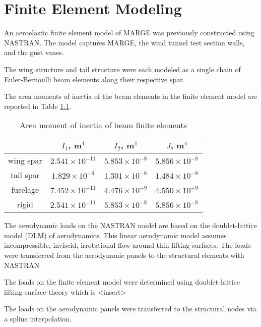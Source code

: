 \chapter{Finite Element Modeling}
\label{ch:nastran}

An aeroelastic finite element model of MARGE was previously constructed using NASTRAN. The model captures MARGE, the wind tunnel test section walls, and the gust vanes.


The wing structure and tail structure were each modeled as a single chain of Euler-Bernoulli beam elements along their respective spar.

The area moments of inertia of the beam elements in the finite element model are reported in Table \ref{tab:beamInertia}.
\begin{table}[H]
    \centering
    \caption{Area moment of inertia of beam finite elements}
    \begin{tabular}{cccc}
        \hline\hline
                  & $I_1$, m$^4$          & $I_2$, m$^4$         & $J$, m$^4$           \\
        \hline
        wing spar & $2.541\times10^{-11}$ & $5.853\times10^{-8}$ & $5.856\times10^{-8}$ \\
        tail spar & $1.829\times10^{-9}$  & $1.301\times10^{-8}$ & $1.484\times10^{-8}$ \\
        fuselage  & $7.452\times10^{-11}$ & $4.476\times10^{-9}$ & $4.550\times10^{-9}$ \\
        rigid     & $2.541\times10^{-11}$ & $5.853\times10^{-8}$ & $5.856\times10^{-8}$ \\
        \hline\hline
    \end{tabular}
    \label{tab:beamInertia}
\end{table}

The aerodynamic loads on the NASTRAN model are based on the doublet-lattice model (DLM) of aerodynamics. This linear aerodynamic model assumes incompressible, inviscid, irrotational flow around thin lifting surfaces. The loads were transferred from the aerodynamic panels to the structural elements with NASTRAN

 The loads on the finite element model were determined using doublet-lattice lifting surface theory which is <insert>
 
 The loads on the aerodynamic panels were transferred to the structural nodes via a spline interpolation.